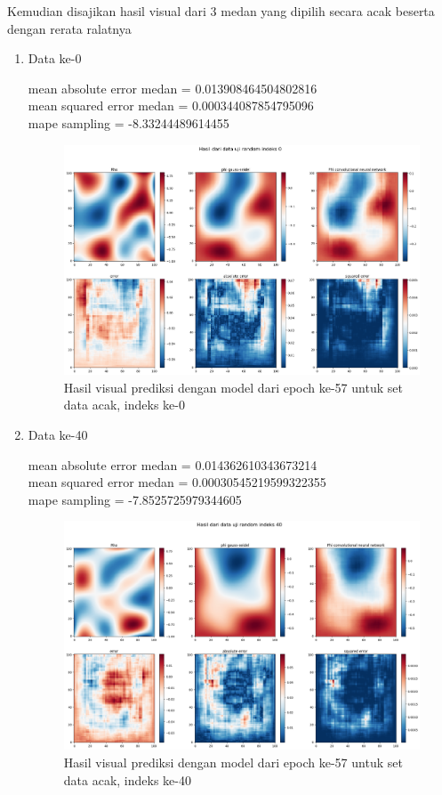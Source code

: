 Kemudian disajikan hasil visual dari 3 medan yang dipilih secara acak beserta dengan rerata ralatnya
\begin{enumerate}
    \item Data ke-0
    
    mean absolute error medan =  0.013908464504802816\\
    mean squared error medan =  0.000344087854795096\\
    mape sampling =  -8.33244489614455
    \begin{figure}[h!]
    \centering
    \includegraphics[width=12cm]{gambar/0_57_acak.png}
    \caption{Hasil visual prediksi dengan model dari epoch ke-57 untuk set data acak, indeks ke-0}
    \label{0_57_acak}
    \end{figure}

    \item Data ke-40

    mean absolute error medan =  0.014362610343673214\\
    mean squared error medan =  0.00030545219599322355\\
    mape sampling =  -7.8525725979344605
    \begin{figure}[h!]
    \centering
    \includegraphics[width=12cm]{gambar/40_57_acak.png}
    \caption{Hasil visual prediksi dengan model dari epoch ke-57 untuk set data acak, indeks ke-40}
    \label{40_57_acak}
    \end{figure}


\end{enumerate}
